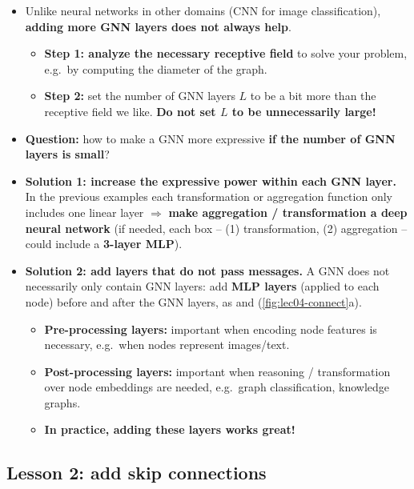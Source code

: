 \begin{itemize}
  \item Unlike neural networks in other domains (CNN for image classification),
    \textbf{adding more GNN layers does not always help}.
    \begin{itemize}
      \item \textbf{Step 1: analyze the necessary receptive field} to solve your
        problem, e.g.\ by computing the diameter of the graph.
      \item \textbf{Step 2:} set the number of GNN layers $L$ to be a bit more
        than the receptive field we like. \textbf{Do not set $L$ to be
        unnecessarily large!}
    \end{itemize}
  \item \textbf{Question:} how to make a GNN more expressive \textbf{if the
    number of GNN layers is small}?
  \item \textbf{Solution 1: increase the expressive power within each GNN
    layer.} In the previous examples each transformation or aggregation function
    only includes one linear layer $\Rightarrow$ \textbf{make aggregation /
    transformation a deep neural network} (if needed, each box -- (1)
    transformation, (2) aggregation -- could include a \textbf{3-layer MLP}).
  \item \textbf{Solution 2: add layers that do not pass messages.} A GNN does
    not necessarily only contain GNN layers: add \textbf{MLP layers} (applied to
    each node) before and after the GNN layers, as  and
     (\cref{fig:lec04-connect}a).
    \begin{itemize}
      \item \textbf{Pre-processing layers:} important when encoding node
        features is necessary, e.g.\ when nodes represent images/text.
      \item \textbf{Post-processing layers:} important when reasoning /
        transformation over node embeddings are needed, e.g.\ graph
        classification, knowledge graphs.
      \item \textbf{In practice, adding these layers works great!}
    \end{itemize}
\end{itemize}

\subsection{Lesson 2: add skip connections}\label{sec:lec04-skip}

